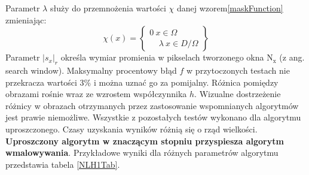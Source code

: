 \documentclass[12pt, twoside, openany]{report}
\theoremstyle{definition}
\begin{document}
Parametr $\lambda$ służy do przemnożenia wartości $\chi$ danej wzorem\eqref{maskFunction} zmieniając:
\begin{equation}
\chi \left(x\right)=\left\{ \begin{array}{c}
0\ x \in \Omega \\ 
\ \ \ \ \ \lambda\ x \in D/ \Omega \end{array}
\right\}
\end{equation}
Parametr $|s_x|_r$ określa wymiar promienia w pikselach tworzonego okna $\mathrm{N_x}$ (z ang. search window).
Maksymalny procentowy błąd $f$ w przytoczonych testach nie przekracza wartości 3\% i można uznać go za pomijalny. Różnica pomiędzy obrazami rośnie wraz ze wzrostem współczynnika $h$. Wizualne dostrzeżenie różnicy w obrazach otrzymanych przez zastosowanie wspomnianych algorytmów jest prawie niemożliwe. Wszystkie z pozostałych testów wykonano dla algorytmu uproszczonego. Czasy uzyskania wyników różnią się o rząd wielkości. \textbf{Uproszczony algorytm w znaczącym stopniu przyspiesza algorytm wmalowywania}. Przykładowe wyniki dla różnych parametrów algorytmu przedstawia tabela \autoref{NLH1Tab}.
\end{document}
